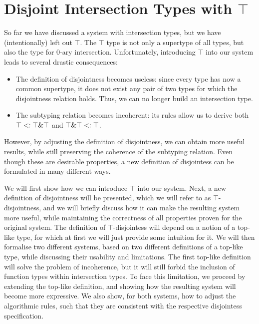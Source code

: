 \section{Disjoint Intersection Types with $\top$}

So far we have discussed a system with intersection types, but we have (intentionally) left out $\top$.
The $\top$ type is not only a supertype of all types, but also the type for 0-ary intersection. 
Unfortunately, introducing $\top$ into our system leads to several drastic consequences:

\begin{itemize}
\item The definition of disjointness becomes useless:
since every type has now a common supertype, it does not exist any pair of two types for which the disjointness relation
holds. Thus, we can no longer build an intersection type.
\item The subtyping relation becomes incoherent: its rules allow us to derive both $\top <: \top \& \top$ and 
$\top \& \top <: \top$.
\end{itemize}

However, by adjusting the definition of disjointness, we can obtain more useful results, while still preserving the
coherence of the subtyping relation.
Even though these are desirable properties, a new definition of disjointess can be formulated in many different ways. 

We will first show how we can introduce $\top$ into our system.
Next, a new definition of disjointness will be presented, which we will refer to as $\top$-disjointness, and
we will briefly discuss how it can make the resulting system more useful, while maintaining the correctness
of all properties proven for the original system.
The definition of $\top$-disjointess will depend on a notion of a top-like type, for which at first we will just provide 
some intuition for it.
We will then formalise two different systems, based on two different definitions of a top-like type, while discussing their
usability and limitations.
The first top-like definition will solve the problem of incoherence, but it will still forbid the inclusion of
function types within intersection types.
To face this limitation, we proceed by extending the top-like definition, and showing how the resulting system will become 
more expressive.
We also show, for both systems, how to adjust the algorithmic rules, such that they are consistent with the 
respective disjointess specification.

